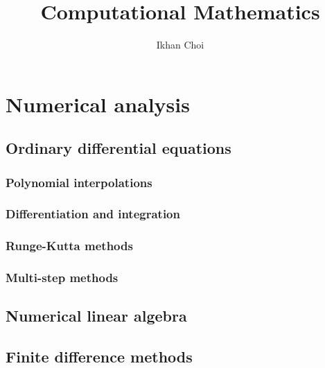 \documentclass{../../large}
\begin{document}
\title{Computational Mathematics}
\author{Ikhan Choi}
\maketitle
\tableofcontents
\part{Numerical analysis}

\chapter{Ordinary differential equations}
\section{Polynomial interpolations}
\section{Differentiation and integration}
\section{Runge-Kutta methods}
\section{Multi-step methods}




\chapter{Numerical linear algebra}


\chapter{Finite difference methods}
\end{document}
